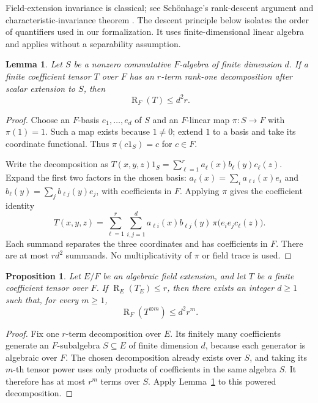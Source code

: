 \documentclass[11pt]{article}
\newtheorem{proposition}[theorem]{Proposition}
\newtheorem{lemma}[theorem]{Lemma}
\theoremstyle{remark}
\DeclareMathOperator{\rank}{R}
\numberwithin{equation}{section}
\begin{document}
Field-extension invariance is classical; see Sch\"onhage's rank-descent
argument and characteristic-invariance theorem
\cite[Theorems~2.7--2.8]{Schonhage}. The descent principle below
isolates the order of quantifiers used in our formalization. It uses
finite-dimensional linear algebra and applies without a separability
assumption.

\begin{lemma}\label{lem:projection}
Let $S$ be a nonzero commutative $F$-algebra of finite dimension $d$.
If a finite coefficient tensor $T$ over $F$ has an $r$-term rank-one
decomposition after scalar extension to $S$, then
\[
\rank_F(T)\leq d^2r.
\]
\end{lemma}
\begin{proof}
Choose an $F$-basis $e_1,\ldots,e_d$ of $S$ and an $F$-linear map
$\pi:S\to F$ with $\pi(1)=1$. Such a map exists because $1\ne0$;
extend $1$ to a basis and take its coordinate functional. Thus
$\pi(c1_S)=c$ for $c\in F$.

Write the decomposition as
$T(x,y,z)1_S=\sum_{\ell=1}^r a_\ell(x)b_\ell(y)c_\ell(z)$.
Expand the first two factors in the chosen basis:
$a_\ell(x)=\sum_i a_{\ell i}(x)e_i$ and
$b_\ell(y)=\sum_j b_{\ell j}(y)e_j$, with coefficients in $F$.
Applying $\pi$ gives the coefficient identity
\[
T(x,y,z)=\sum_{\ell=1}^r\sum_{i,j=1}^d
a_{\ell i}(x)b_{\ell j}(y)\,
\pi\bigl(e_i e_j c_\ell(z)\bigr).
\]
Each summand separates the three coordinates and has coefficients
in $F$. There are at most $rd^2$ summands. No multiplicativity of
$\pi$ or field trace is used.
\end{proof}

\begin{proposition}\label{prop:powers}
Let $E/F$ be an algebraic field extension, and let $T$ be a finite
coefficient tensor over $F$. If $\rank_E(T_E)\leq r$, then there
exists an integer $d\geq1$ such that, for every $m\geq1$,
\begin{equation}\label{eq:descent}
\rank_F(T^{\otimes m})\leq d^2r^m.
\end{equation}
\end{proposition}
\begin{proof}
Fix one $r$-term decomposition over $E$. Its finitely many coefficients
generate an $F$-subalgebra $S\subseteq E$ of finite dimension $d$,
because each generator is algebraic over $F$. The chosen decomposition
already exists over $S$, and taking its $m$-th tensor power uses only
products of coefficients in the same algebra $S$. It therefore has
at most $r^m$ terms over $S$. Apply Lemma~\ref{lem:projection} to
this powered decomposition.
\end{proof}
\end{document}
